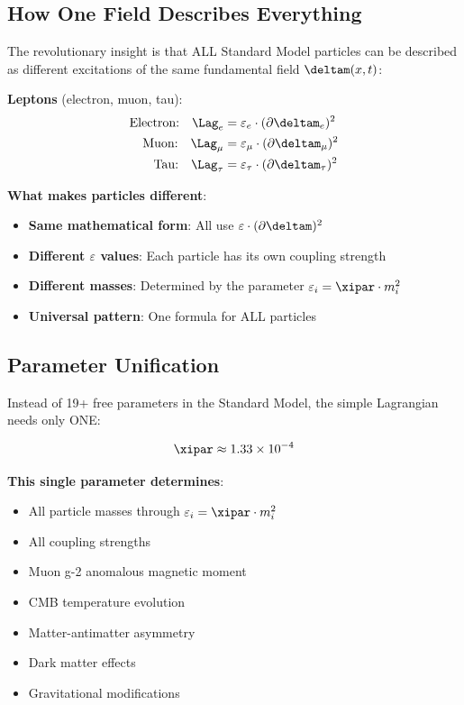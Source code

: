 	\subsection{How One Field Describes Everything}
	
	The revolutionary insight is that ALL Standard Model particles can be described as different excitations of the same fundamental field $\deltam(x,t)$:
	
	\textbf{Leptons} (electron, muon, tau):
	\begin{align}
		\text{Electron:} \quad \Lag_e &= \varepsilon_e \cdot (\partial \deltam_e)^2 \\
		\text{Muon:} \quad \Lag_{\mu} &= \varepsilon_{\mu} \cdot (\partial \deltam_{\mu})^2 \\
		\text{Tau:} \quad \Lag_{\tau} &= \varepsilon_{\tau} \cdot (\partial \deltam_{\tau})^2
	\end{align}
	
	\textbf{What makes particles different}:
	\begin{itemize}
		\item \textbf{Same mathematical form}: All use $\varepsilon \cdot (\partial \deltam)^2$
		\item \textbf{Different $\varepsilon$ values}: Each particle has its own coupling strength
		\item \textbf{Different masses}: Determined by the parameter $\varepsilon_i = \xipar \cdot m_i^2$
		\item \textbf{Universal pattern}: One formula for ALL particles
	\end{itemize}
	
	\subsection{Parameter Unification}
	
	Instead of 19+ free parameters in the Standard Model, the simple Lagrangian needs only ONE:
	
	\begin{equation}
		\xipar \approx 1.33 \times 10^{-4}
		\label{eq:universal_parameter}
	\end{equation}
	
	\textbf{This single parameter determines}:
	\begin{itemize}
		\item All particle masses through $\varepsilon_i = \xipar \cdot m_i^2$
		\item All coupling strengths
		\item Muon g-2 anomalous magnetic moment
		\item CMB temperature evolution
		\item Matter-antimatter asymmetry
		\item Dark matter effects
		\item Gravitational modifications
	\end{itemize}
	
